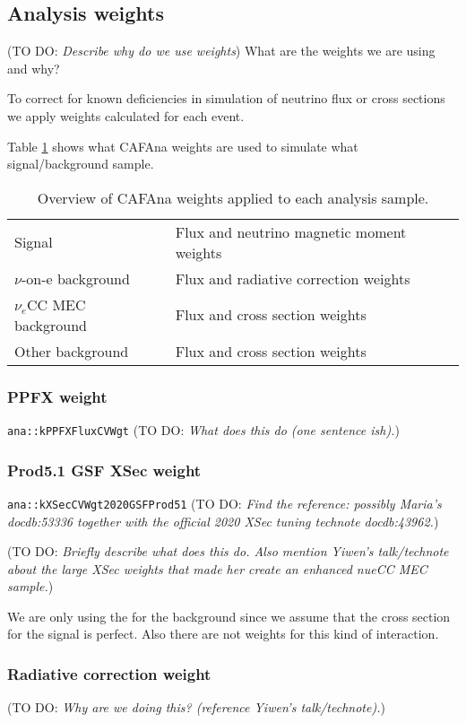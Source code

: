 \documentclass[12pt]{article}
\newcommand{\todo }[1]{({\color{red}\sc TO DO: \textit{#1}})}
\begin{document}
\subsection{Analysis weights}
\todo{Describe why do we use weights}
What are the weights we are using and why?

To correct for known deficiencies in simulation of neutrino flux or cross sections we apply weights calculated for each event.

Table \ref{tab:WeightsOverview} shows what CAFAna weights are used to simulate what signal/background sample.

\begin{table}[!ht]
\centering
\def\arraystretch{1.4}
\begin{tabular}{l@{\hskip 1in}l}
Signal                   & Flux and neutrino magnetic moment weights\\
$\nu$-on-e background    & Flux and radiative correction weights\\
$\nu_e$CC MEC background & Flux and cross section weights\\
Other background         & Flux and cross section weights
\end{tabular}
\caption{Overview of CAFAna weights applied to each analysis sample.}
\label{tab:WeightsOverview}
\end{table}

\subsubsection*{PPFX weight}
\texttt{ana::kPPFXFluxCVWgt} \cite{NOVA-doc-23441}
\todo{What does this do (one sentence ish).}

\subsubsection*{Prod5.1 GSF XSec weight}
\texttt{ana::kXSecCVWgt2020GSFProd51}
\todo{Find the reference: possibly Maria's docdb:53336 together with the official 2020 XSec tuning technote docdb:43962.}

\todo{Briefly describe what does this do. Also mention Yiwen's talk/technote about the large XSec weights that made her create an enhanced nueCC MEC sample.}

We are only using the for the background since we assume that the cross section for the signal is perfect. Also there are not weights for this kind of interaction.

\subsubsection*{Radiative correction weight}
\todo{Why are we doing this? (reference Yiwen's talk/technote).}
\end{document}
